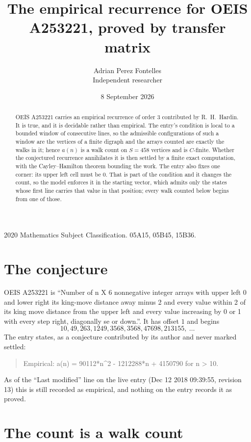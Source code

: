 \documentclass[11pt,a4paper]{article}
\title{The empirical recurrence for OEIS A253221, proved by transfer matrix}
\author{Adrian Perez Fontelles\\ \small Independent researcher}
\date{8 September 2026}
\theoremstyle{plain}
\theoremstyle{definition}
\begin{document}
\maketitle

\begin{abstract}
OEIS A253221 carries an empirical recurrence of order $3$ contributed by R.~H.~Hardin. It is
true, and it is decidable rather than empirical. The entry's condition is local to a bounded window of consecutive lines, so
the admissible configurations of such a window are the vertices of a finite digraph and the
arrays counted are exactly the walks in it; hence $a(n)$ is a walk count on $S=458$ vertices
and is $C$-finite. Whether the conjectured recurrence annihilates it is then settled by a
finite exact computation, with the Cayley--Hamilton theorem bounding the work.
 The entry also fixes one corner: its upper left cell must be $0$. That is part of the condition and it changes the count, so the model enforces it in the starting vector, which admits only the states whose first line carries that value in that position; every walk counted below begins from one of those.\end{abstract}

\noindent\small 2020 Mathematics Subject Classification. 05A15, 05B45, 15B36.\normalsize

\section{The conjecture}

OEIS A253221 is ``Number of n X 6 nonnegative integer arrays with upper left 0 and lower right its king-move distance away minus 2 and every value within 2 of its king move distance from the upper left and every value increasing by 0 or 1 with every step right, diagonally se or down.''. It has offset $1$ and begins
\[
10, 49, 263, 1249, 3568, 3568, 47698, 213155,\ \dots
\]
The entry states, as a conjecture contributed by its author and never marked settled:
\begin{quote}
Empirical: a(n) = 90112*n\^{}2 - 1212288*n + 4150790 for n > 10.
\end{quote}
As of the ``Last modified'' line on the live entry (Dec 12 2018 09:39:55, revision 13) this is still
recorded as empirical, and nothing on the entry records it as proved.

\section{The count is a walk count}
\end{document}
